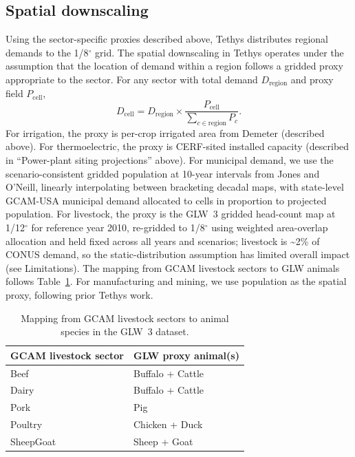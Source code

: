 \documentclass[fleqn,10pt]{wlscirep}
\begin{document}
\subsection*{Spatial downscaling}

Using the sector-specific proxies described above, Tethys distributes regional demands to the 1/8$^{\circ}$ grid. The spatial downscaling in Tethys operates under the assumption that the location of demand within a region follows a gridded proxy appropriate to the sector. For any sector with total demand $D_{\mathrm{region}}$ and proxy field $P_{\mathrm{cell}}$,
\begin{equation}
D_{\mathrm{cell}} = D_{\mathrm{region}} \times \frac{P_{\mathrm{cell}}}{\sum_{c \in \mathrm{region}} P_{c}}.
\label{eq:spatial}
\end{equation}
For irrigation, the proxy is per-crop irrigated area from Demeter (described above). For thermoelectric, the proxy is CERF-sited installed capacity (described in ``Power-plant siting projections'' above). For municipal demand, we use the scenario-consistent gridded population at 10-year intervals from Jones and O'Neill\cite{Jones_2016}, linearly interpolating between bracketing decadal maps, with state-level GCAM-USA municipal demand allocated to cells in proportion to projected population. For livestock, the proxy is the GLW~3 gridded head-count map\cite{Gilbert2018} at 1/12$^{\circ}$ for reference year 2010, re-gridded to 1/8$^{\circ}$ using weighted area-overlap allocation and held fixed across all years and scenarios; livestock is \textasciitilde2\% of CONUS demand, so the static-distribution assumption has limited overall impact (see Limitations). The mapping from GCAM livestock sectors to GLW animals follows Table~\ref{tab:livestock}. For manufacturing and mining, we use population as the spatial proxy, following prior Tethys work\cite{Khan2023}.

\begin{table}[!ht]
\centering
\begin{tabular}{ll}
\toprule
\textbf{GCAM livestock sector} & \textbf{GLW proxy animal(s)} \\
\midrule
Beef      & Buffalo + Cattle \\
Dairy     & Buffalo + Cattle \\
Pork      & Pig \\
Poultry   & Chicken + Duck \\
SheepGoat & Sheep + Goat \\
\bottomrule
\end{tabular}
\caption{Mapping from GCAM livestock sectors to animal species in the GLW~3 dataset.}
\label{tab:livestock}
\end{table}
\end{document}
